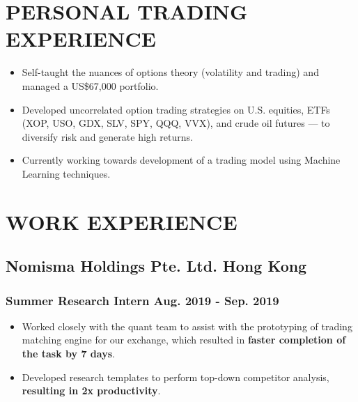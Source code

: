 \documentclass{article}
\begin{document}
\vspace{-7.1mm}

\section{PERSONAL TRADING EXPERIENCE}
\vspace{-2mm}
\begin{itemize}[noitemsep]

\item Self-taught the nuances of options theory (volatility and trading) and managed a US\$67,000 portfolio.
\item Developed uncorrelated option trading strategies on U.S. equities, ETFs (XOP, USO, GDX, SLV, SPY, QQQ, VVX), and crude oil futures — to diversify risk and generate high returns.
\item Currently working towards development of a trading model using Machine Learning techniques.
\end{itemize}

\vspace{-6.5mm}


\section{WORK EXPERIENCE}
\vspace{-2mm}
\subsection{Nomisma Holdings Pte. Ltd. \hspace{4.1in} Hong Kong}
\subsubsection{Summer Research Intern \hspace{4.5in} Aug. 2019 - Sep. 2019}
\vspace{-2.9mm}
\begin{itemize}[noitemsep]
\item Worked closely with the quant team to assist with the prototyping of trading matching engine for our exchange, which
resulted in \textbf{faster completion of the task by 7 days}.
\item Developed research templates to perform top-down competitor analysis, \textbf{resulting in 2x productivity}.
\end{itemize}
\end{document}
